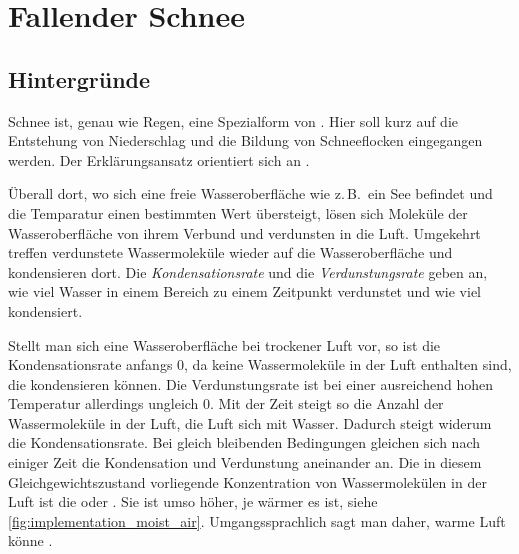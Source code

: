 \section{Fallender Schnee}

\subsection{Hintergründe}

Schnee ist, genau wie Regen, eine Spezialform von .
Hier soll kurz auf die Entstehung von Niederschlag und die Bildung von
Schneeflocken eingegangen werden. Der Erklärungsansatz orientiert sich
an \cite{wiki:Luftfeuchtigkeit}.

Überall dort, wo sich eine freie Wasseroberfläche wie z.\,B.\ ein See befindet und
die Temparatur einen bestimmten Wert übersteigt, lösen sich Moleküle der
Wasseroberfläche von ihrem Verbund und verdunsten in die Luft. Umgekehrt treffen
verdunstete Wassermoleküle wieder auf die Wasseroberfläche und kondensieren
dort. Die \emph{Kondensationsrate} und die
\emph{Verdunstungsrate} geben an, wie viel Wasser in einem Bereich zu
einem Zeitpunkt verdunstet und wie viel kondensiert.

Stellt man sich eine Wasseroberfläche bei trockener Luft vor, so ist
die Kondensationsrate anfangs 0, da keine Wassermoleküle in der Luft
enthalten sind, die kondensieren können. Die Verdunstungsrate ist
bei einer ausreichend hohen Temperatur allerdings ungleich 0. Mit der
Zeit steigt so die Anzahl der Wassermoleküle in der Luft, die Luft
 sich mit Wasser. Dadurch steigt widerum die
Kondensationsrate. Bei gleich bleibenden Bedingungen gleichen sich
nach einiger Zeit die Kondensation und Verdunstung aneinander an.  Die
in diesem Gleichgewichtszustand vorliegende Konzentration von
Wassermolekülen in der Luft ist die
 oder . Sie ist umso höher, je wärmer es ist, siehe
\autoref{fig:implementation_moist_air}. Umgangssprachlich sagt man
daher, warme Luft könne .

